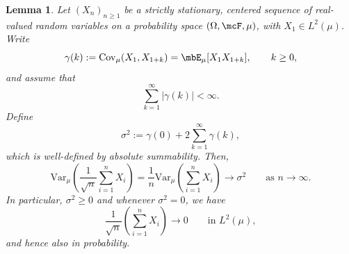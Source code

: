\documentclass[a4paper]{article}
\numberwithin{equation}{section}   %
\theoremstyle{plain}   %
\theoremstyle{plain}   %
\newtheorem{lemma}{Lemma}[section]   %
\theoremstyle{examplestyle}
\begin{document}
    \begin{lemma}
    \label{lemma:variance_limit}
        Let \((X_n)_{n\ge1}\) be a strictly stationary, centered sequence of real-valued random variables on a probability space \((\Omega,\mcF,\mu)\), with \(X_1\in L^2(\mu)\). Write
        \[
            \gamma(k)
            :=
            \mathrm{Cov}_\mu(X_1,X_{1+k})
            =
            \mbE_\mu[X_1X_{1+k}],
            \qquad k\ge0,
        \]
        and assume that
        \[
            \sum_{k=1}^\infty |\gamma(k)|<\infty.
        \]
        Define
        \[
            \sigma^2
            :=
            \gamma(0)+2\sum_{k=1}^\infty \gamma(k),
        \]
        which is well-defined by absolute summability. Then, 
        \[
            \mathrm{Var}_\mu\!\left(\frac{1}{\sqrt n}
                \sum_{i=1}^n X_i
            \right)
            =
            \frac1n\mathrm{Var}_\mu\left(\sum_{i=1}^n X_i\right)
            \longrightarrow
            \sigma^2
            \qquad\text{as }n\to\infty.
        \]
        In particular, \(\sigma^2\ge0\) and whenever \(\sigma^2=0\), we have
        \[
            \frac{1}{\sqrt n}\left(\sum_{i=1}^n X_i\right)\to0
            \qquad\text{in }L^2(\mu),
        \]
        and hence also in probability.
    \end{lemma}
\end{document}
